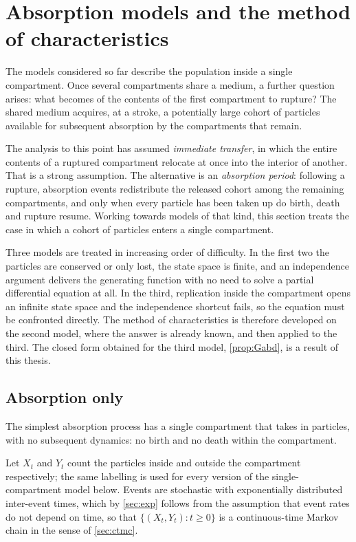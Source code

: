 \section{Absorption models and the method of characteristics}
\label{sec:moc}

The models considered so far describe the population inside a single compartment.
Once several compartments share a medium, a further question arises: what becomes
of the contents of the first compartment to rupture? The shared medium acquires, at
a stroke, a potentially large cohort of particles available for subsequent
absorption by the compartments that remain.

The analysis to this point has assumed \emph{immediate transfer}, in which the
entire contents of a ruptured compartment relocate at once into the interior of
another. That is a strong assumption. The alternative is an \emph{absorption
period}: following a rupture, absorption events redistribute the released cohort
among the remaining compartments, and only when every particle has been taken up do
birth, death and rupture resume. Working towards models of that kind, this section
treats the case in which a cohort of particles enters a single compartment.

Three models are treated in increasing order of difficulty. In the first two the
particles are conserved or only lost, the state space is finite, and an
independence argument delivers the generating function with no need to solve a
partial differential equation at all. In the third, replication inside the
compartment opens an infinite state space and the independence shortcut fails, so
the equation must be confronted directly. The method of characteristics is
therefore developed on the second model, where the answer is already known, and
then applied to the third. The closed form obtained for the third model,
\cref{prop:Gabd}, is a result of this thesis.

\subsection{Absorption only}
\label{sec:absonly}

The simplest absorption process has a single compartment that takes in particles,
with no subsequent dynamics: no birth and no death within the compartment.

Let $X_t$ and $Y_t$ count the particles inside and outside the compartment
respectively; the same labelling is used for every version of the
single-compartment model below. Events are stochastic with exponentially
distributed inter-event times, which by \cref{sec:exp} follows from the assumption
that event rates do not depend on time, so that $\{(X_t,Y_t):t\ge0\}$ is a
continuous-time Markov chain in the sense of \cref{sec:ctmc}.


